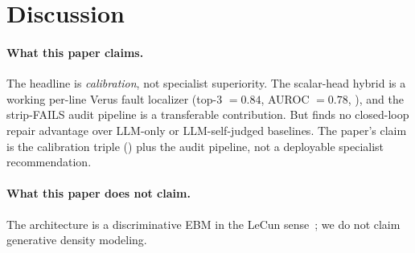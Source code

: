 \documentclass[10pt]{article}
\begin{document}
\section{Discussion}
\label{sec:discussion}

\paragraph{What this paper claims.} The headline is
\emph{calibration}, not specialist superiority. The scalar-head hybrid is a
working per-line Verus fault localizer (top-3 $= 0.84$,
AUROC $= 0.78$, ), and the strip-FAILS audit
pipeline is a transferable contribution. But 
finds no closed-loop repair advantage over LLM-only or LLM-self-judged
baselines. The paper's claim is the calibration triple
() plus the
audit pipeline, not a deployable specialist recommendation.

\paragraph{What this paper does not claim.}
The architecture is a discriminative EBM in the LeCun
sense~\cite{lecun2006tutorial}; we do not claim generative density
modeling.
\end{document}
